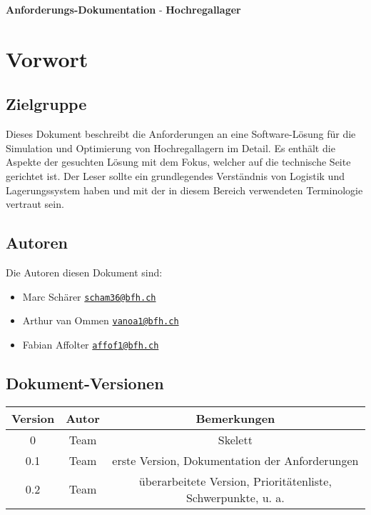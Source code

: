 \documentclass[11pt,a4paper]{article}
\begin{document}
{\huge \textbf{Anforderungs-Dokumentation}} - \textbf{Hochregallager} \\
\tableofcontents

\section{Vorwort}
%
\subsection{Zielgruppe}
Dieses Dokument beschreibt die Anforderungen an eine Software-Lösung für die Simulation und Optimierung von Hochregallagern im Detail. Es enthält die Aspekte der gesuchten Lösung mit dem Fokus, welcher auf die technische Seite gerichtet ist. Der Leser sollte ein grundlegendes Verständnis von Logistik und Lagerungssystem haben und mit der in diesem Bereich verwendeten Terminologie vertraut sein. 
%
\subsection{Autoren}
Die Autoren diesen Dokument sind:
%
\begin{itemize}
  \item Marc Schärer \href{mailto:scham36@bfh.ch}{\nolinkurl{scham36@bfh.ch}}
  \item Arthur van Ommen \href{mailto:vanoa1@bfh.ch}{\nolinkurl{vanoa1@bfh.ch}}
  \item Fabian Affolter \href{mailto:affof11@bfh.ch}{\nolinkurl{affof1@bfh.ch}}
\end{itemize}
%
\subsection{Dokument-Versionen}

\begin{table}[h]

  \begin{center}
    \begin{tabular}{|c|c|c|}
      \hline
      \textbf{Version} & \textbf{Autor} & \textbf{Bemerkungen} \\
      \hline
      0 & Team & Skelett \\
      0.1 & Team & erste Version, Dokumentation der Anforderungen \\
      0.2 & Team & überarbeitete Version, Prioritätenliste, Schwerpunkte, u. a. \\
      \hline
    \end{tabular}
  \end{center}
\end{table}
%
%
\end{document}
